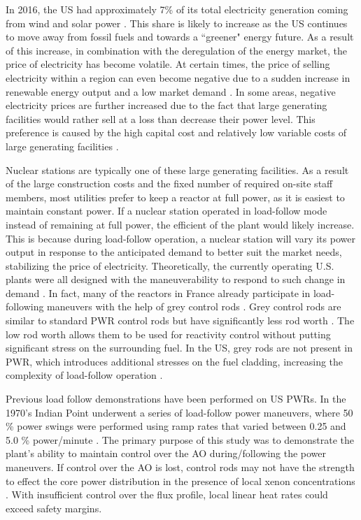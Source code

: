 \documentclass[edeposit,fullpage,11pt]{uiucthesis2009}
\begin{document}
In 2016, the \gls{US} had approximately 7\% of its total electricity generation coming from wind and solar power \cite{u.s_energy_information_administration_electricity_2016}. 
This share is likely to increase as the \gls{US} continues to move away from fossil fuels and towards a ``greener" energy future.
As a result of this increase, in combination with the deregulation of the energy market, the price of electricity has become volatile. 
At certain times, the price of selling electricity within a region can even become negative due to a sudden increase in renewable energy output and a low market demand \cite{paraschiv_impact_2014}. 
In some areas, negative electricity prices are further increased due to the fact that large generating facilities would rather sell at a loss than decrease their power level. 
This preference is caused by the high capital cost and relatively low variable costs of large generating facilities \cite{lokhov_load-following_2011}.

Nuclear stations are typically one of these large generating facilities.
As a result of the large construction costs and the fixed number of required on-site staff members, most utilities prefer to keep a reactor at full power, as it is easiest to maintain constant power. 
If a nuclear station operated in load-follow mode instead of remaining at full power, the efficient of the plant would likely increase.
This is because during load-follow operation, a nuclear station will vary its power output in response to the anticipated demand to better suit the market needs, stabilizing the price of electricity.
Theoretically, the currently operating U.S. plants were all designed with the maneuverability to respond to such change in demand \cite{lokhov_technical_2011}.
In fact, many of the reactors in France already participate in load-following maneuvers with the help of grey control rods \cite{lokhov_technical_2011}.
Grey control rods are similar to standard \gls{PWR} control rods but have significantly less rod worth \cite{yousefpour_improvement_2000}.
The low rod worth allows them to be used for reactivity control without putting significant stress on the surrounding fuel. 
In the \gls{US}, grey rods are not present in \gls{PWR}, which introduces additional stresses on the fuel cladding, increasing the complexity of load-follow operation \cite{lokhov_technical_2011}.
  
Previous load follow demonstrations have been performed on \gls{US} \gls{PWR}s.
In the 1970's Indian Point underwent a series of load-follow power maneuvers, where 50 \% power swings were performed using ramp rates that varied between 0.25 and 5.0 \% power/minute \cite{sipush_load-follow_1976}.
The primary purpose of this study was to demonstrate the plant's ability to maintain control over the \gls{AO} during/following the power maneuvers. 
If control over the \gls{AO} is lost, control rods may not have the strength to effect the core power distribution in the presence of local xenon concentrations \cite{sipush_load-follow_1976}.
With insufficient control over the flux profile, local linear heat rates could exceed safety margins.
\end{document}
